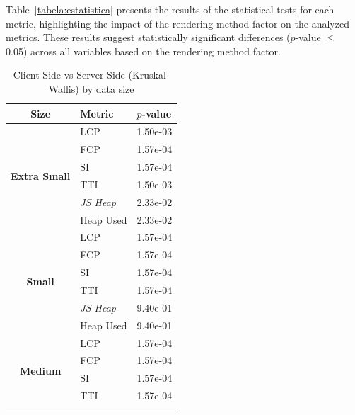 Table~\ref{tabela:estatistica} presents the results of the statistical tests for each metric, highlighting the impact of the rendering method factor on the analyzed metrics. These results suggest statistically significant differences ($p$-value $\leq$ 0.05) across all variables based on the rendering method factor.

\begin{table}[!ht]
\centering
\caption{Client Side vs Server Side (Kruskal-Wallis) by data size}
\begin{tabular}{|c|>{\centering\arraybackslash}m{3cm}|>{\centering\arraybackslash}m{3cm}|}
\hline
\textbf{Size}       & \textbf{Metric}   & \textbf{$p$-value} \\ \hline
\multirow{6}{*}{\textbf{Extra Small}} & LCP       & 1.50e-03     \\ \cline{2-3}
                                      & FCP       & 1.57e-04     \\ \cline{2-3}
                                      & SI        & 1.57e-04     \\ \cline{2-3}
                                      & TTI       & 1.50e-03     \\ \cline{2-3}
                                      & \textit{JS Heap}   & 2.33e-02     \\ \cline{2-3}
                                      & Heap Used & 2.33e-02     \\ \hline
\multirow{6}{*}{\textbf{Small}}       & LCP       & 1.57e-04     \\ \cline{2-3}
                                      & FCP       & 1.57e-04     \\ \cline{2-3}
                                      & SI        & 1.57e-04     \\ \cline{2-3}
                                      & TTI       & 1.57e-04     \\ \cline{2-3}
                                      & \textit{JS Heap}   & 9.40e-01     \\ \cline{2-3}
                                      & Heap Used & 9.40e-01     \\ \hline
\multirow{6}{*}{\textbf{Medium}}      & LCP       & 1.57e-04     \\ \cline{2-3}
                                      & FCP       & 1.57e-04     \\ \cline{2-3}
                                      & SI        & 1.57e-04     \\ \cline{2-3}
                                      & TTI       & 1.57e-04     \\ \cline{2-3}

\end{tabular}
\end{table}
